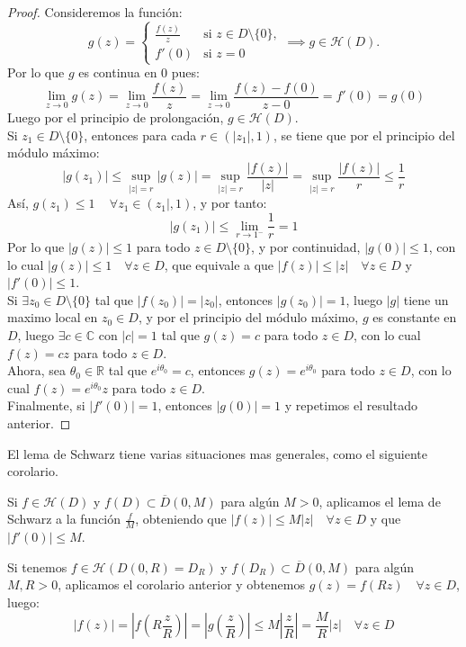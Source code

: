 \begin{proof}
    Consideremos la función:
    \[
    g(z) = 
    \begin{cases}
        \frac{f(z)}{z} & \text{si } z \in D \setminus \{0\}, \\
        f'(0) & \text{si } z = 0
    \end{cases}
    \implies g \in \mathcal{H}(D).
    \]
    Por lo que $g$ es continua en $0$ pues:
    \[
    \lim_{z \to 0} g(z) =
    \lim_{z \to 0} \frac{f(z)}{z} =
    \lim_{z \to 0} \frac{f(z) - f(0)}{z - 0} = 
    f'(0) =
    g(0)
    \]
    Luego por el principio de prolongación, $g \in \mathcal{H}(D)$.\\
    Si $z_1 \in D \setminus \{0\}$, entonces para cada $r \in (|z_1|, 1)$, se tiene que por el principio del módulo máximo:
    \[
    |g(z_1)| \leq 
    \sup_{|z|=r} |g(z)| =
    \sup_{|z|=r} \frac{|f(z)|}{|z|} =
    \sup_{|z|=r} \frac{|f(z)|}{r} \leq
    \frac{1}{r}
    \]
    Así, $g(z_1) \leq 1 \, \quad \forall z_1 \in (z_1|, 1)$, y por tanto:
    \[
    |g(z_1)| \leq \lim_{r \to 1^-} \frac{1}{r} = 1
    \]
    Por lo que $|g(z)| \leq 1$ para todo $z \in D \setminus \{0\}$, y por continuidad, $|g(0)| \leq 1$, con lo cual $\boxed{|g(z)| \leq 1 \quad \forall z \in D}$, que equivale a que $|f(z)| \leq |z| \quad \forall z \in D$ y $|f'(0)| \leq 1$.\\
    Si $\exists z_0 \in D \setminus \{0\}$ tal que $|f(z_0)| = |z_0|$, entonces $|g(z_0)| = 1$, luego $|g|$ tiene un maximo local en $z_0 \in D$, y por el principio del módulo máximo, $g$ es constante en $D$, luego $\exists c \in \mathbb{C}$ con $|c| = 1$ tal que $g(z) = c$ para todo $z \in D$, con lo cual $f(z) = c z$ para todo $z \in D$.\\
    Ahora, sea $\theta_0 \in \mathbb{R}$ tal que $e^{i \theta_0} = c$, entonces $g(z) = e^{i \theta_0} $ para todo $z \in D$, con lo cual $f(z) = e^{i \theta_0} z$ para todo $z \in D$.\\
    Finalmente, si $|f'(0)| = 1$, entonces $|g(0)| = 1$ y repetimos el resultado anterior.
\end{proof}

El lema de Schwarz tiene varias situaciones mas generales, como el siguiente corolario.

\begin{corolario}
    Si $f \in \mathcal{H}(D)$ y $f(D) \subset \overline{D}(0,M)$ para algún $M > 0$, aplicamos el lema de Schwarz a la función $\frac{f}{M}$, obteniendo que $|f(z)| \leq M |z| \quad \forall z \in D$ y que $|f'(0)| \leq M$.
\end{corolario}

\begin{corolario}
    Si tenemos $f \in \mathcal{H}(D(0,R) = D_R)$ y $f(D_R) \subset \overline{D}(0,M)$ para algún $M, R > 0$, aplicamos el corolario anterior y obtenemos $g(z) = f(R z) \quad \forall z \in D$, luego:
    \[
    |f(z)| = 
    |f(R \frac{z}{R})| =
    |g(\frac{z}{R})| \leq
    M |\frac{z}{R}| =
    \frac{M}{R} |z| \quad \forall z \in D
    \]
\end{corolario}
